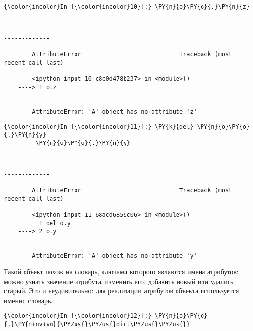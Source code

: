     \begin{Verbatim}[commandchars=\\\{\}]
{\color{incolor}In [{\color{incolor}10}]:} \PY{n}{o}\PY{o}{.}\PY{n}{z}
\end{Verbatim}

    \begin{Verbatim}[commandchars=\\\{\}]

        ---------------------------------------------------------------------------

        AttributeError                            Traceback (most recent call last)

        <ipython-input-10-c8c0d478b237> in <module>()
    ----> 1 o.z
    

        AttributeError: 'A' object has no attribute 'z'

    \end{Verbatim}

    \begin{Verbatim}[commandchars=\\\{\}]
{\color{incolor}In [{\color{incolor}11}]:} \PY{k}{del} \PY{n}{o}\PY{o}{.}\PY{n}{y}
         \PY{n}{o}\PY{o}{.}\PY{n}{y}
\end{Verbatim}

    \begin{Verbatim}[commandchars=\\\{\}]

        ---------------------------------------------------------------------------

        AttributeError                            Traceback (most recent call last)

        <ipython-input-11-68acd6859c06> in <module>()
          1 del o.y
    ----> 2 o.y
    

        AttributeError: 'A' object has no attribute 'y'

    \end{Verbatim}

    Такой объект похож на словарь, ключами которого являются имена
атрибутов: можно узнать значение атрибута, изменить его, добавить новый
или удалить старый. Это и неудивительно: для реализации атрибутов
объекта используется именно словарь.

    \begin{Verbatim}[commandchars=\\\{\}]
{\color{incolor}In [{\color{incolor}12}]:} \PY{n}{o}\PY{o}{.}\PY{n+nv+vm}{\PYZus{}\PYZus{}dict\PYZus{}\PYZus{}}
\end{Verbatim}


